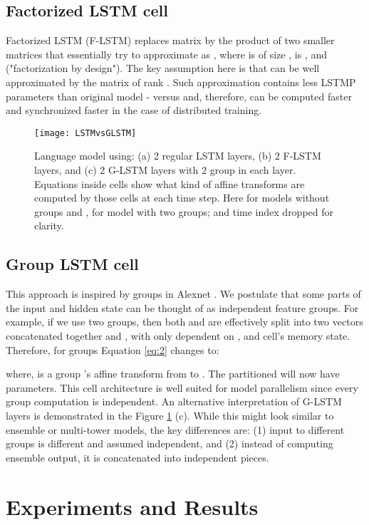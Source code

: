 \documentclass{article} \usepackage{iclr2017_workshop,times}
\begin{document}
\subsection{Factorized LSTM cell}
Factorized LSTM (F-LSTM) replaces matrix   by the product of two smaller matrices that essentially try to approximate  as , where  is of size ,  is  , and   ("factorization by design"). The key assumption here is that  can be well approximated by the matrix of rank . Such approximation contains less LSTMP parameters than original model -  versus  and, therefore, can be computed faster and synchronized faster in the case of distributed training.
\begin{figure}[h]
\begin{center}
\texttt{[image: LSTMvsGLSTM]}
\end{center}
\caption{ Language model using: (a) 2 regular LSTM layers, (b) 2 F-LSTM layers, and (c) 2 G-LSTM layers with 2 group in each layer. Equations inside cells show what kind of affine transforms are computed by those cells at each time step. Here  for models without groups and ,  for model with two groups; and time index dropped for clarity.}
\label{fig:glstm}
\end{figure}
\subsection{Group LSTM cell}
This approach is inspired by groups in Alexnet \citep{krizhevsky2012imagenet}. We postulate that some parts of the input  and hidden state  can be thought of as independent feature groups. For example, if we use two groups, then both  and  are effectively split into two vectors concatenated together  and , with  only dependent on ,  and cell's memory state. Therefore, for  groups Equation \ref{eq:2} changes to:

where,  is a group 's affine transform from  to . The partitioned  will now have  parameters. This cell architecture is well suited for model parallelism since every group computation is independent.
An alternative interpretation of G-LSTM layers is demonstrated in the Figure \ref{fig:glstm} (c). 
While this might look similar to ensemble \citep{shazeer2017outrageously} or multi-tower \citep{ciregan2012multi} models, the key differences are: (1) input to different groups is different and assumed independent, and (2) instead of computing ensemble output, it is concatenated into independent pieces. 

\section{Experiments and Results} \label{expsection}
\end{document}
